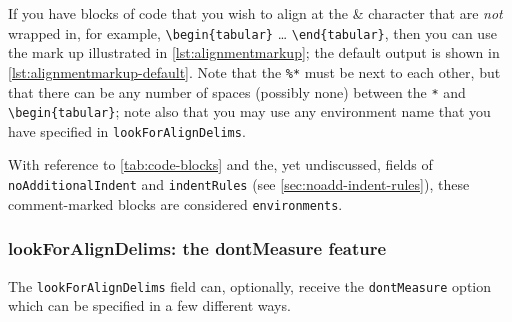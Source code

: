  If you have blocks of code that you wish to align at the \& character that are
 \emph{not} wrapped in, for example, \lstinline!\begin{tabular}! \ldots
 \lstinline!\end{tabular}!, then you can use the mark up illustrated in
 \cref{lst:alignmentmarkup}; the default output is shown in
 \cref{lst:alignmentmarkup-default}. Note that the \lstinline!%*! must be next to each
 other, but that there can be any number of spaces (possibly none) between the
 \lstinline!*! and \lstinline!\begin{tabular}!; note also that you may use any
 environment name that you have specified in \texttt{lookForAlignDelims}.

 \begin{cmhtcbraster}[raster left skip=-1.5cm,]
 \end{cmhtcbraster}

 With reference to \vref{tab:code-blocks} and the, yet undiscussed, fields of
 \texttt{noAdditionalIndent} and \texttt{indentRules} (see
 \vref{sec:noadd-indent-rules}), these comment-marked blocks are considered
 \texttt{environments}.

\subsubsection{lookForAlignDelims: the dontMeasure feature}\label{sec:dontMeasure}
 The  \texttt{lookForAlignDelims} field can,
 optionally, receive the \texttt{dontMeasure} option which can be specified in a few
 different ways.


